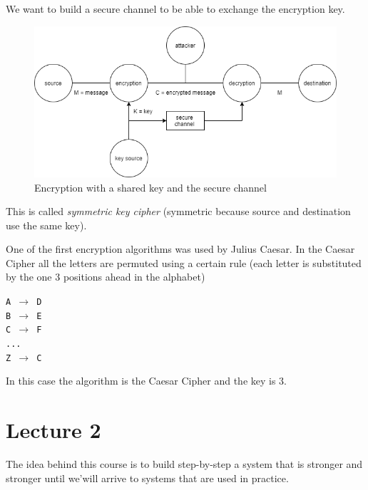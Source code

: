 \documentclass[a4paper, 12pt]{report}
\begin{document}
We want to build a secure channel to be able to exchange the encryption key.

\begin{figure}[H]
	\centering
	\includegraphics[scale=0.6]{images/enc2.png}
	\caption{Encryption with a shared key and the secure channel}
	\label{fig:enc2}
\end{figure}

This is called \textit{symmetric key cipher} (symmetric because source and destination use the same key).

One of the first encryption algorithms was used by Julius Caesar. In the Caesar Cipher all the letters are permuted using a certain rule (each letter is substituted by the one 3 positions ahead in the alphabet)

\begin{center}
	\texttt{A $\rightarrow$ D\\
	B $\rightarrow$ E\\
	C $\rightarrow$ F\\
	...\\
	Z $\rightarrow$ C}
\end{center}

In this case the algorithm is the Caesar Cipher and the key is 3.

\chapter*{Lecture 2}
The idea behind this course is to build step-by-step a system that is stronger and stronger until we'will arrive to systems that are used in practice.\\
\end{document}
